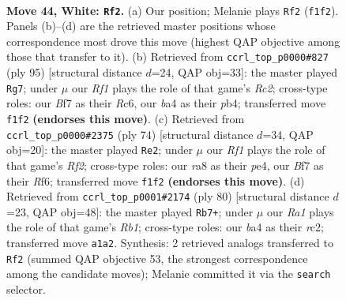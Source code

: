 \documentclass[11pt]{article}
\begin{document}
\clearpage

\begin{figure}[p]\centering
\begin{subfigure}{0.46\textwidth}\centering
\resizebox{\linewidth}{!}{%
\newchessgame
\chessboard[
  setfen={r7/1p3B2/p7/4P1kp/bP1r4/P6K/8/R4R2 w - - 1 44},
  showmover=false,
  pgfstyle=straightmove, color=movearrow, markmove={f1-f2}
]}
\caption{}
\end{subfigure}\hfill
\begin{subfigure}{0.46\textwidth}\centering
\resizebox{\linewidth}{!}{%
\newchessgame
\chessboard[
  setfen={8/2r5/p1r2k1p/1p1R4/1P6/P7/1KP1R3/8 b - - 17 48},
  showmover=false,
  pgfstyle=straightmove, color=movearrow, markmove={c7-g7}
]}
\caption{}
\end{subfigure}
\\[4pt]
\begin{subfigure}{0.46\textwidth}\centering
\resizebox{\linewidth}{!}{%
\newchessgame
\chessboard[
  setfen={4r3/1p6/p4R2/7k/P3p3/2P3r1/1P3R2/1K6 w - - 0 38},
  showmover=false,
  pgfstyle=straightmove, color=movearrow, markmove={f2-e2}
]}
\caption{}
\end{subfigure}\hfill
\begin{subfigure}{0.46\textwidth}\centering
\resizebox{\linewidth}{!}{%
\newchessgame
\chessboard[
  setfen={8/3k4/5p2/4p3/7p/3P1r1P/2r5/1R1RB2K w - - 0 41},
  showmover=false,
  pgfstyle=straightmove, color=movearrow, markmove={b1-b7}
]}
\caption{}
\end{subfigure}
\caption{\textbf{Move 44, White: \texttt{Rf2}.} (a) Our position; Melanie plays \texttt{Rf2} (\texttt{f1f2}). Panels (b)--(d) are the retrieved master positions whose correspondence most drove this move (highest QAP objective among those that transfer to it). (b) Retrieved from \texttt{ccrl\_top\_p0000\#827} (ply 95) [structural distance $d$=24, QAP obj=33]: the master played \texttt{Rg7}; under $\mu$ our \emph{Rf1} plays the role of that game's \emph{Rc2}; cross-type roles: our \emph{B}f7 as their \emph{R}c6, our \emph{b}a4 as their \emph{p}b4; transferred move \texttt{f1f2} \textbf{(endorses this move)}. (c) Retrieved from \texttt{ccrl\_top\_p0000\#2375} (ply 74) [structural distance $d$=34, QAP obj=20]: the master played \texttt{Re2}; under $\mu$ our \emph{Rf1} plays the role of that game's \emph{Rf2}; cross-type roles: our \emph{r}a8 as their \emph{p}e4, our \emph{B}f7 as their \emph{R}f6; transferred move \texttt{f1f2} \textbf{(endorses this move)}. (d) Retrieved from \texttt{ccrl\_top\_p0001\#2174} (ply 80) [structural distance $d$=23, QAP obj=48]: the master played \texttt{Rb7+}; under $\mu$ our \emph{Ra1} plays the role of that game's \emph{Rb1}; cross-type roles: our \emph{b}a4 as their \emph{r}c2; transferred move \texttt{a1a2}. Synthesis: 2 retrieved analogs transferred to \texttt{Rf2} (summed QAP objective 53, the strongest correspondence among the candidate moves); Melanie committed it via the \texttt{search} selector.}
\label{fig:thought-m86}
\end{figure}
\end{document}
